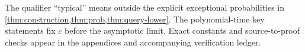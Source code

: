 The qualifier ``typical'' means outside the explicit exceptional probabilities in \cref{thm:construction,thm:prob,thm:query-lower}. The polynomial-time key statements fix $c$ before the asymptotic limit. Exact constants and source-to-proof checks appear in the appendices and accompanying verification ledger.
\clearpage
